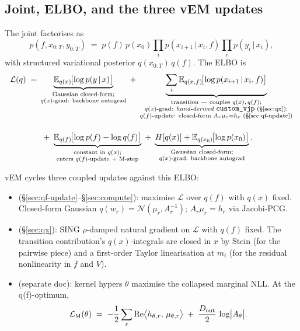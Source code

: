 \documentclass[11pt]{article}
\newcommand{\E}{\mathbb{E}}
\newcommand{\given}{\,|\,}
\newcommand{\code}[1]{\texttt{\small #1}}
\begin{document}
\subsection*{Joint, ELBO, and the three vEM updates}

The joint factorises as
\begin{equation}
p(f, x_{0:T}, y_{0:T})
\;=\;
p(f)\,p(x_0)
\prod_i p(x_{i+1}\given x_i, f)
\prod_i p(y_i\given x_i),
\end{equation}
with structured variational posterior $q(x_{0:T})\,q(f)$. The ELBO is
\begin{equation}
\begin{aligned}
\mathcal{L}(q)
\;=\;
&\underbrace{\E_{q(x)}\!\bigl[\log p(y\given x)\bigr]}_{\substack{\text{Gaussian closed-form;}\\\text{$q(x)$-grad: backbone autograd}}}
\;+\;
\underbrace{\sum_i \E_{q(x,f)}\!\bigl[\log p(x_{i+1}\given x_i, f)\bigr]}_{\substack{\text{transition --- couples $q(x), q(f)$;}\\\text{$q(x)$-grad: \emph{hand-derived} \code{custom\_vjp} (§\ref{sec:qx});}\\\text{$q(f)$-update: closed-form $A_r\mu_r{=}h_r$ (§\ref{sec:qf-update})}}}
\\[1.2em]
&\;+\;
\underbrace{\E_{q(f)}\!\bigl[\log p(f) - \log q(f)\bigr]}_{\substack{\text{constant in $q(x)$;}\\\text{enters $q(f)$-update + M-step}}}
\;+\;
\underbrace{H[q(x)] + \E_{q(x_0)}\!\bigl[\log p(x_0)\bigr]}_{\substack{\text{Gaussian closed-form;}\\\text{$q(x)$-grad: backbone autograd}}}.
\end{aligned}
\label{eq:elbo}
\end{equation}

vEM cycles three coupled updates against this ELBO:

\begin{itemize}
\setlength\itemsep{2pt}
\item[\textbf{q(f) update}\ ] (§\ref{sec:qf-update}–§\ref{sec:compute}):
maximise $\mathcal{L}$ over $q(f)$ with $q(x)$ fixed. Closed-form Gaussian
$q(w_r)=\mathcal{N}(\mu_r, A_r^{-1})$; $A_r\mu_r=h_r$ via Jacobi-PCG.

\item[\textbf{q(x) update}\ ] (§\ref{sec:qx}):
SING $\rho$-damped natural gradient on $\mathcal{L}$ with $q(f)$ fixed.
The transition contribution's $q(x)$-integrals are closed in $x$ by
Stein (for the pairwise piece) and a first-order Taylor linearisation
at $m_i$ (for the residual nonlinearity in $\bar f$ and $V$).

\item[\textbf{M-step}\ ] (separate doc): kernel hypers $\theta$ maximise the
collapsed marginal NLL. At the q(f)-optimum,
\begin{equation}
\mathcal{L}_{\rm M}(\theta)
\;=\;
-\frac{1}{2}\sum_r \mathrm{Re}\bigl\langle h_{\theta,r},\, \mu_{\theta,r}\bigr\rangle
\;+\;\frac{D_{\rm out}}{2}\,\log\bigl|A_\theta\bigr|.
\label{eq:Mstep-collapsed}
\end{equation}
\end{itemize}
\end{document}

